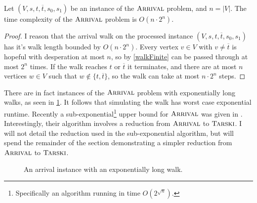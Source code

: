 \begin{cor}
  Let $(V, s, t, \overline{t}, s_0, s_1)$ be an instance of the $\textsc{Arrival}$ problem,
  and $n = |V|$. The time complexity of the $\textsc{Arrival}$ problem is $O(n \cdot 2^n)$.
\end{cor}
\begin{proof}
  I reason that the arrival walk on the processed instance $(V, s, t, \overline{t}, s_0, s_1)$
  has it's walk length bounded by $O(n \cdot 2^n)$. Every vertex $v \in V$ with $v \neq \overline{t}$
  is hopeful with desperation at most $n$, so by \cref{walkFinite} can be passed through at most
  $2^{n}$ times. If the walk reaches $t$ or $\overline{t}$ it terminates, and there are at most
  $n$ vertices $w \in V$ such that $w \not\in \{t, \overline{t}\}$, so the walk can take at most
  $n \cdot 2^n$ steps.
\end{proof}
There are in fact instances of the $\textsc{Arrival}$ problem with exponentially long walks,
as seen in \cref{expLongArrival}. It follows that simulating the walk has worst
case exponential runtime. Recently a sub-exponential\footnote{Specifically an algorithm running
in time $O(2^{\sqrt{n}})$.} upper bound for $\textsc{Arrival}$ was given in \citep{gärtner2021subexponential}.
Interestingly, their algorithm involves a reduction from $\textsc{Arrival}$ to $\textsc{Tarski}$. I will not detail
the reduction used in the sub-exponential algorithm, but will spend the remainder of the section
demonstrating a simpler reduction from $\textsc{Arrival}$ to $\textsc{Tarski}$.
\begin{figure}
  \caption{An arrival instance with an exponentially long walk.}\label{expLongArrival}
\end{figure}
\newcommand{\fin}{f_{\text{in}}}
